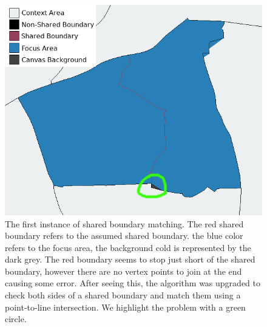 \begin{figure}
\includegraphics[width=1\textwidth]{images/ch6/WeirdBoundary3}
\caption{ The first instance of shared boundary matching. The red shared boundary refers to the assumed shared boundary. the blue color refers to the focus area, the background cold is represented by the dark grey. The red boundary seems to stop just short of the shared boundary, however there are no vertex points to join at the end causing some error. After seeing this, the algorithm was upgraded to check both sides of a shared boundary and match them using a point-to-line intersection. We highlight the problem with a green circle. }\label{fig:weirdBoundary}
\end{figure} 


